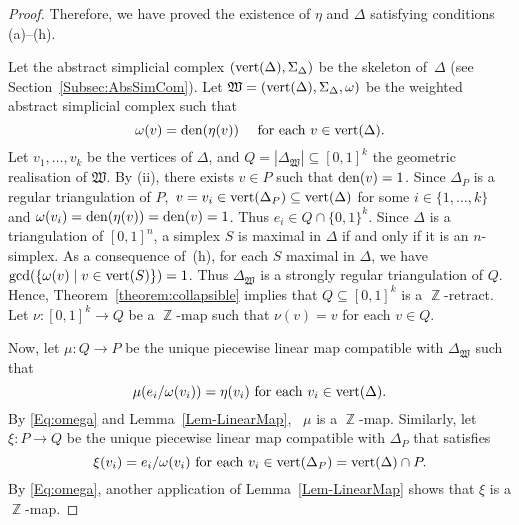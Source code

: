 \documentclass[reqno, draft]{amsart}
\theoremstyle{definition}
\begin{document}
\begin{proof}
Therefore, we have proved the existence of 
$\eta$ and $\Delta$ satisfying conditions (a)--(h). 

\bigskip

Let the abstract simplicial complex $(\operatorname{{\rm vert}}(\Delta),\Sigma_{\Delta})$ 
be the skeleton of~$\Delta$ (see Section~\ref{Subsec:AbsSimCom}). 
Let  $\mathfrak{W}=(\operatorname{{\rm vert}}(\Delta),\Sigma_{\Delta},\omega)$  
be the weighted abstract simplicial complex such that   
\begin{equation}\label{Eq:omega}
  \omega(v)=\operatorname{{\rm den}}(\eta(v))\quad \mbox{ for each } v\in\operatorname{{\rm vert}}(\Delta).
\end{equation}
Let $v_1,\ldots,v_k$ be the vertices of $\Delta$,
and  $Q=|\Delta_{\mathfrak{W}}|\subseteq [0,1]^k$ 
the geometric  realisation of $\mathfrak{W}$. 
By (ii), there exists $v\in P$ such that $\operatorname{{\rm den}}(v)=1$. 
Since $\Delta_P$ is a regular triangulation of $P$,\, 
$v=v_i\in\operatorname{{\rm vert}}(\Delta_P)\subseteq\operatorname{{\rm vert}}(\Delta)$ for some 
$i\in\{1,\ldots,k\}$ and $\omega(v_i)=\operatorname{{\rm den}}(\eta(v))=\operatorname{{\rm den}}(v)=1$. 
Thus $e_i\in Q\cap \{0,1\}^k$. 
Since $\Delta$ is a triangulation of $[0,1]^n$, 
a simplex $S$ is maximal in $\Delta$ if and only if it is an $n$-simplex. 
As a consequence of~(h), for each $S$ maximal in $\Delta$,
we have $\gcd(\{\omega(v)\mid v\in\operatorname{{\rm vert}}(S)\})=1$.
Thus $\Delta_{\mathfrak{W}}$ 
is a strongly regular triangulation of $Q$. 
Hence, Theorem~\ref{theorem:collapsible} 
implies that $Q\subseteq [0,1]^k$ is a $\operatorname{\mathbb{Z}}$-retract. 
Let $\nu\colon [0,1]^k\to Q$  be a $\operatorname{\mathbb{Z}}$-map 
such that $\nu(v)=v$ for each $v\in Q$. 

Now, 
let  $\mu\colon Q\to P$ be the unique piecewise linear map 
compatible with $\Delta_{\mathfrak{W}}$ such that
\begin{equation}\label{Eq:mu}
\mu(e_i/\omega(v_i))=\eta(v_i)\mbox{ for each }v_i\in\operatorname{{\rm vert}}(\Delta).
\end{equation} 
By \eqref{Eq:omega} and Lemma~\ref{Lem-LinearMap}, 
\ $\mu$ is a $\operatorname{\mathbb{Z}}$-map.
Similarly, 
let $\xi\colon P\to Q$  be the unique piecewise linear map 
compatible with $\Delta_P$ that satisfies
\begin{equation}\label{Eq:xi}
   \xi(v_i)=e_i/\omega(v_i)\mbox{ for each }   
v_i\in\operatorname{{\rm vert}}(\Delta_P)=\operatorname{{\rm vert}}(\Delta)\cap P.
\end{equation} 
By \eqref{Eq:omega}, 
another application of Lemma~\ref{Lem-LinearMap}
shows that $\xi$ is a $\operatorname{\mathbb{Z}}$-map. 


\end{proof}
\end{document}

